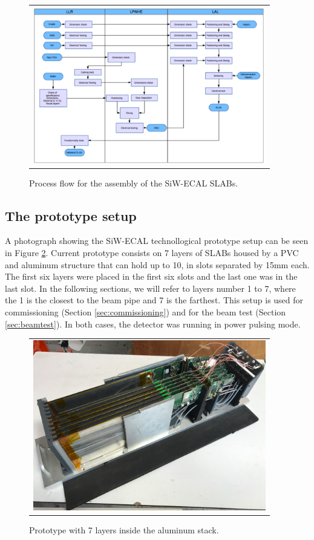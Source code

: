 \documentclass[a4paper,11pt]{article}
\begin{document}
\begin{figure}[!t]
\centering
\begin{tabular}{l}
\includegraphics[width=4.0in]{../figs/assembly.png} 
\end{tabular}
\caption{Process flow for the assembly of the SiW-ECAL SLABs.}
\label{assembly}
\end{figure}

\subsection{The prototype setup}
\label{sec:setup2}

A photograph showing the SiW-ECAL technollogical prototype setup can be seen in Figure \ref{proto}.
Current prototype consists on 7 layers of SLABs housed by a PVC and aluminum structure that can hold up to 10, in slots separated by 15mm each.
The first six layers were placed in the first six slots and the last one was in the last slot. In the following sections, we will refer to layers number 1 to 7, where
the 1 is the closest to the beam pipe and 7 is the farthest.
This setup is used for commissioning (Section \ref{sec:commissioning}) and for the beam test
(Section \ref{sec:beamtest}). In both cases, the detector was
running in power pulsing mode.

\begin{figure}[!ht]
\centering
\begin{tabular}{l}
\includegraphics[width=4.0in]{../figs/proto.png} 
\end{tabular}
\caption{Prototype with 7 layers inside the aluminum stack.}
\label{proto}
\end{figure}
\end{document}
